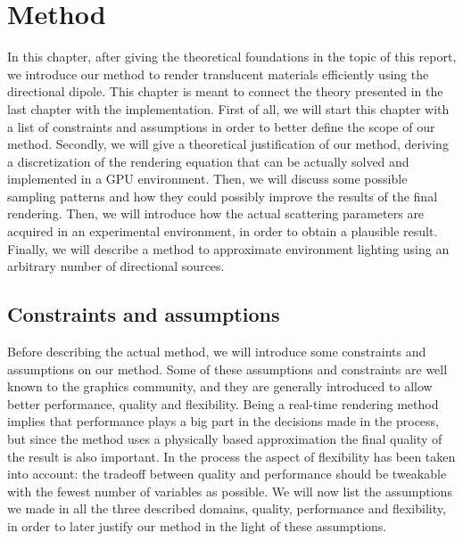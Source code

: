 \chapter{Method}
\label{chap:method}
In this chapter, after giving the theoretical foundations in the topic of this report, we introduce our method to render translucent materials efficiently using the directional dipole. This chapter is meant to connect the theory presented in the last chapter with the implementation. First of all, we will start this chapter with a list of constraints and assumptions in order to better define the scope of our method. Secondly, we will give a theoretical justification of our method, deriving a discretization of the rendering equation that can be actually solved and implemented in a GPU environment. Then, we will discuss some possible sampling patterns and how they could possibly improve the results of the final rendering. Then, we will introduce how the actual scattering parameters are acquired in an experimental environment, in order to obtain a plausible result. Finally, we will describe a method to approximate environment lighting using an arbitrary number of directional sources.

\section{Constraints and assumptions}

Before describing the actual method, we will introduce some constraints and assumptions on our method. Some of these assumptions and constraints are well known to the graphics community, and they are generally introduced to allow better performance, quality and flexibility. Being a real-time rendering method implies that performance plays a big part in the decisions made in the process, but since the method uses a physically based approximation the final quality of the result is also important. In the process the aspect of flexibility has been taken into account: the tradeoff between quality and performance should be tweakable with the fewest number of variables as possible. We will now list the assumptions we made in all the three described domains, quality, performance and flexibility, in order to later justify our method in the light of these assumptions. 

